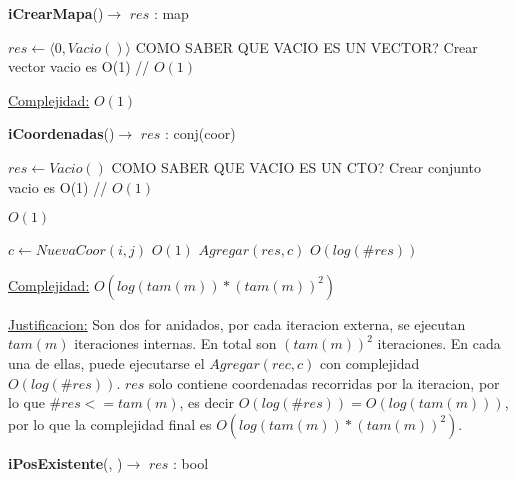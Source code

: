 \begin{Algoritmos}


\begin{algorithm}[H]
{\textbf{iCrearMapa}()$\to$ $res$ : map}
\begin{algorithmic}[1]
   
\State $res \gets  \langle 0 , Vacio() \rangle $     COMO SABER QUE VACIO ES UN VECTOR?  \Comment Crear vector vacio es O(1) // $O(1)$

\medskip
\Statex \underline{Complejidad:} $O(1)$

\end{algorithmic}
\end{algorithm}

\begin{algorithm}[H]
{\textbf{iCoordenadas}()$\to$ $res$ : conj(coor)}
\begin{algorithmic}[1]
   
 
\State $res \gets Vacio() $     COMO SABER QUE VACIO ES UN CTO?  \Comment Crear conjunto vacio es O(1) // $O(1)$

	
		
		  \Comment $O(1)$
			
			\State $c \gets NuevaCoor(i, j) $  \Comment $O(1)$			
			\State $Agregar(res, c) $  \Comment $O(log(\#res))$			
			
		\EndIf
		
	\EndFor

\EndFor


\medskip
\Statex \underline{Complejidad:} $O(log(tam(m))*(tam(m))^2)$

\Statex \underline{Justificacion:} Son dos for anidados, por cada iteracion externa, se ejecutan $tam(m)$ iteraciones internas. En total son $(tam(m))^2$ iteraciones. En cada una de ellas, puede ejecutarse el $Agregar(rec, c)$ con complejidad $O(log(\#res))$. $res$ solo contiene coordenadas recorridas por la iteracion, por lo que $\#res <= tam(m)$, es decir $O(log(\#res)) = O(log(tam(m)))$, por lo que la complejidad final es $O(log(tam(m))*(tam(m))^2)$.

\end{algorithmic}
\end{algorithm}


\begin{algorithm}[H]
{\textbf{iPosExistente}(, )$\to$ $res$ : bool}
\begin{algorithmic}[1]
   


\end{algorithmic}
\end{algorithm}
\end{Algoritmos}
